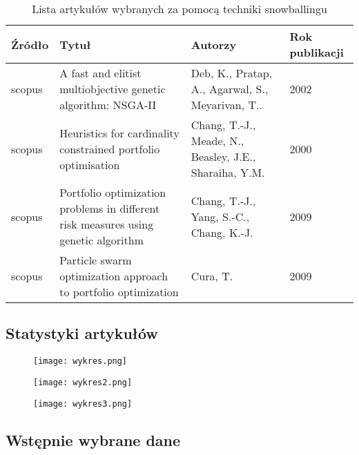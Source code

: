 \documentclass[polish,envcountsect,10pt]{article}
\begin{document}
\begin{table}[H]
	\caption{Lista artykułów wybranych za pomocą techniki snowballingu}
	\centering
	\begin{tabular}{|p{2cm}|p{6cm}|p{3cm}|p{2cm}|}
		\hline
		Źródło & Tytuł                                                                              & Autorzy                                                & Rok publikacji \\
		\hline
		scopus & A fast and elitist multiobjective genetic algorithm: NSGA-II                       & Deb, K., Pratap, A., Agarwal, S., Meyarivan, T..       & 2002           \\
		\hline
		scopus & Heuristics for cardinality constrained portfolio optimisation                      & Chang, T.-J., Meade, N., Beasley, J.E., Sharaiha, Y.M. & 2000           \\
		\hline
		scopus & Portfolio optimization problems in different risk measures using genetic algorithm & Chang, T.-J., Yang, S.-C., Chang, K.-J.                & 2009           \\
		\hline
		scopus & Particle swarm optimization approach to portfolio optimization                     & Cura, T.                                               & 2009           \\
		\hline
	\end{tabular}
\end{table}

\subsection{Statystyki artykułów}

\begin{figure}[H]
	\centering
	\texttt{[image: wykres.png]}
\end{figure}

\begin{figure}[H]
	\centering
	\texttt{[image: wykres2.png]}
\end{figure}

\begin{figure}[H]
	\centering
	\texttt{[image: wykres3.png]}
\end{figure}

\subsection{Wstępnie wybrane dane}
\end{document}
